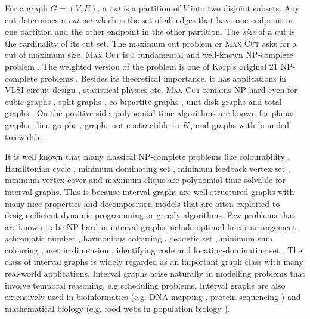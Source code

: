 \documentclass[11pt]{article}
\begin{document}
For a graph $G = (V, E)$, a \emph{cut} is a partition of $V$ into two disjoint subsets. Any cut determines a \emph{cut set} which is the set of all edges that have one endpoint in one partition and the other endpoint in the other partition. The \emph{size} of a cut is the cardinality of its cut set. The maximum cut problem or \textsc{Max Cut} asks for a cut of maximum size. \textsc{Max Cut} is a fundamental and well-known NP-complete problem \cite{garey1990guide}. The weighted version of the problem is one of Karp's original 21 NP-complete problems \cite{karp1972reducibility}. Besides its theoretical importance, it has applications in VLSI circuit design \cite{chang1987}, statistical physics \cite{barahona1988application} etc. \textsc{Max Cut} remains NP-hard even for cubic graphs \cite{berman1999some}, split graphs \cite{bodlaender2000complexity}, co-bipartite graphs \cite{bodlaender2000complexity}, unit disk graphs \cite{diaz2007max} and total graphs \cite{guruswami1999maximum}. On the positive side, polynomial time algorithms are known for planar graphs \cite{hadlock1975finding}, line graphs \cite{guruswami1999maximum}, graphs not contractible to $K_5$ \cite{barahona1983max} and graphs with bounded treewidth \cite{bodlaender2000complexity}.


It is well known that many classical NP-complete problems like colourability \cite{golumbic2004}, Hamiltonian cycle \cite{keil1985finding}, minimum dominating set \cite{chang1998efficient}, minimum feedback vertex set \cite{lu1997linear}, minimum vertex cover \cite{marathe1992generalized} and maximum clique \cite{imai1983finding} are polynomial time  solvable for interval graphs. This is because interval graphs are well structured graphs with many nice properties and decomposition models that are often exploited to design efficient dynamic programming or greedy algorithms. Few problems that are known to be NP-hard in interval graphs include optimal linear arrangement \cite{cohen2006optimal}, achromatic number \cite{bodlaender1989achromatic}, harmonious colouring \cite{asdre2007harmonious}, geodetic set \cite{chakraborty2020algorithms}, minimum sum colouring \cite{marx2005short}, metric dimension \cite{foucaud2017}, identifying code \cite{foucaud2017} and locating-dominating set \cite{foucaud2017}. The class of interval graphs is widely regarded as an important graph class with many real-world applications. Interval graphs arise naturally in modelling problems that involve temporal reasoning, e.g scheduling problems. Interval graphs are also extensively used in bioinformatics (e.g. DNA mapping \cite{zhang1994algorithm}, protein sequencing \cite{jungck1982computer}) and mathematical biology (e.g. food webs in population biology \cite{cohen1978food}). 
\end{document}
